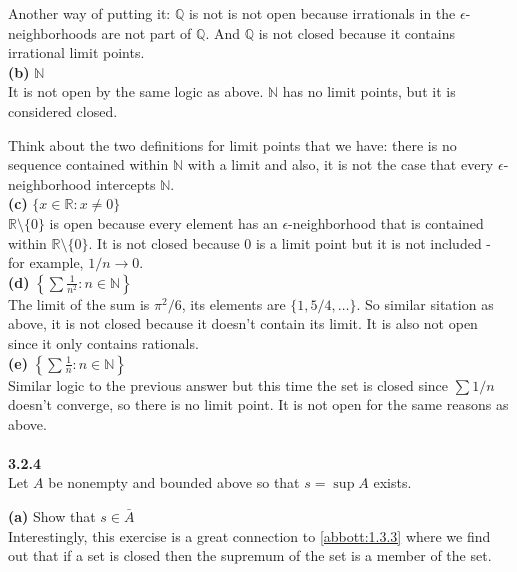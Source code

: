 Another way of putting it: $\mathbb{Q}$ is not is not open because irrationals in the $\epsilon$-neighborhoods
are not part of $\mathbb{Q}$. And $\mathbb{Q}$ is not closed because it contains irrational limit points.
\\

\textbf{(b)} $\mathbb{N}$
\\

It is not open by the same logic as above.
$\mathbb{N}$ has no limit points, but it is considered closed.

Think about the two definitions for limit points that we have: there is no sequence contained within $\mathbb{N}$
with a limit and also, it is not the case that every $\epsilon$-neighborhood intercepts $\mathbb{N}$.
\\

\textbf{(c)} $\{ x\in\mathbb{R} : x \neq 0 \}$
\\

$\mathbb{R} \setminus \{0\}$ is open because every element has an $\epsilon$-neighborhood that is contained within
$\mathbb{R} \setminus \{0\}$.
It is not closed because 0 is a limit point but it is not included - for example, $1/n \rightarrow 0$.
\\

\textbf{(d)} $\left\{ \sum \frac{1}{n^2} : n\in\mathbb{N} \right\}$
\\

The limit of the sum is $\pi^2 / 6$, its elements are $\{1, 5/4, \ldots \}$.
So similar sitation as above, it is not closed because it doesn't contain its limit.
It is also not open since it only contains rationals.
\\

\textbf{(e)} $\left\{ \sum \frac{1}{n} : n\in\mathbb{N} \right\}$
\\
Similar logic to the previous answer but this time the set is closed since $\sum 1/n$ doesn't converge,
so there is no limit point.
It is not open for the same reasons  as above.
\\~\\



\label{abbott:3.2.4}
\textbf{3.2.4}
\\

Let $A$ be nonempty and bounded above so that $s = \sup A$ exists.

\textbf{(a)} Show that $s\in \bar{A}$
\\

Interestingly, this exercise is a great connection to \ref{abbott:1.3.3} where we find out that if a set is closed
then the supremum of the set is a member of the set.

